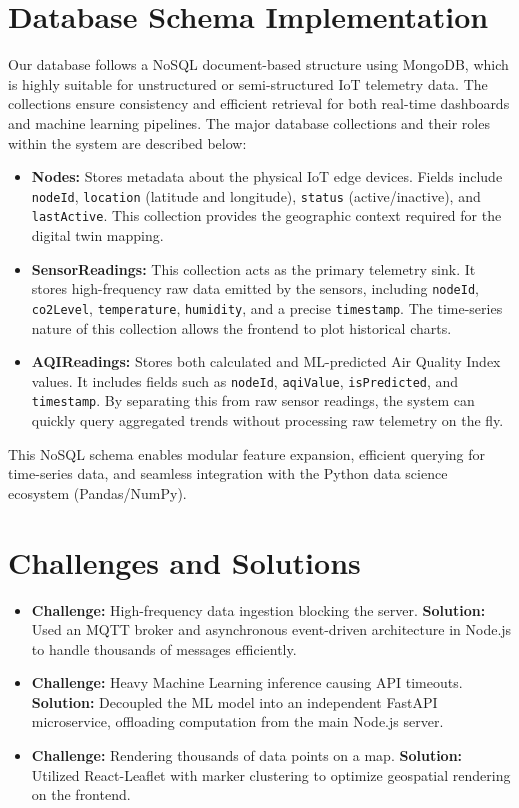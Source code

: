 \documentclass[a4paper, 12pt]{report}
\begin{document}
\section{Database Schema Implementation}
Our database follows a NoSQL document-based structure using MongoDB, which is highly suitable for unstructured or semi-structured IoT telemetry data. The collections ensure consistency and efficient retrieval for both real-time dashboards and machine learning pipelines.
The major database collections and their roles within the system are described below:
\begin{itemize}
\item \textbf{Nodes:} Stores metadata about the physical IoT edge devices. Fields include \texttt{nodeId}, \texttt{location} (latitude and longitude), \texttt{status} (active/inactive), and \texttt{lastActive}. This collection provides the geographic context required for the digital twin mapping.
\item \textbf{SensorReadings:} This collection acts as the primary telemetry sink. It stores high-frequency raw data emitted by the sensors, including \texttt{nodeId}, \texttt{co2Level}, \texttt{temperature}, \texttt{humidity}, and a precise \texttt{timestamp}. The time-series nature of this collection allows the frontend to plot historical charts.
\item \textbf{AQIReadings:} Stores both calculated and ML-predicted Air Quality Index values. It includes fields such as \texttt{nodeId}, \texttt{aqiValue}, \texttt{isPredicted}, and \texttt{timestamp}. By separating this from raw sensor readings, the system can quickly query aggregated trends without processing raw telemetry on the fly.
\end{itemize}
This NoSQL schema enables modular feature expansion, efficient querying for time-series data, and seamless integration with the Python data science ecosystem (Pandas/NumPy).
\section{Challenges and Solutions}
\begin{itemize}
	\item \textbf{Challenge:} High-frequency data ingestion blocking the server.
	  \textbf{Solution:} Used an MQTT broker and asynchronous event-driven architecture in Node.js to handle thousands of messages efficiently.
	
	\item \textbf{Challenge:} Heavy Machine Learning inference causing API timeouts.
	  \textbf{Solution:} Decoupled the ML model into an independent FastAPI microservice, offloading computation from the main Node.js server.
	
	\item \textbf{Challenge:} Rendering thousands of data points on a map.
	  \textbf{Solution:} Utilized React-Leaflet with marker clustering to optimize geospatial rendering on the frontend.
\end{itemize}
\end{document}
